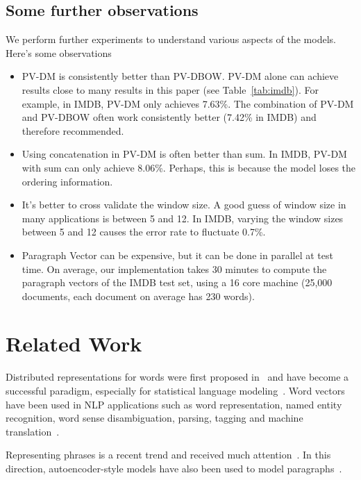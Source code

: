 \documentclass{article}
\begin{document}
\subsection{Some further observations}
We perform further experiments to understand various aspects of the
models. Here's some observations
\begin{itemize}
\item PV-DM is consistently better than PV-DBOW. PV-DM alone can
  achieve results close to many results in this paper (see
  Table~\ref{tab:imdb}). For example, in IMDB, PV-DM only achieves
  7.63\%. The combination of PV-DM and PV-DBOW often work consistently
  better (7.42\% in IMDB) and therefore recommended.
\item Using concatenation in PV-DM is often better than sum. In IMDB,
  PV-DM with sum can only achieve 8.06\%. Perhaps, this is because the
  model loses the ordering information.
\item It's better to cross validate the window size. A good
  guess of window size in many applications is between 5 and 12. In
  IMDB, varying the window sizes between 5 and 12 causes the error
  rate to fluctuate 0.7\%.
\item Paragraph Vector can be expensive, but it can be done in
  parallel at test time. On average, our implementation takes 30
  minutes to compute the paragraph vectors of the IMDB test set, using
  a 16 core machine (25,000 documents, each document on average has
  230 words).
\end{itemize}

\section{Related Work}






Distributed representations for words were first proposed
in~\cite{rumelhart1986learning} and have become a successful paradigm,
especially for statistical language
modeling~\cite{elman,bengio2006neural,mikolov2012}. Word vectors have
been used in NLP applications such as word representation, named
entity recognition, word sense disambiguation, parsing, tagging and
machine
translation~\cite{collobert2008unified,turney10,turian2010word,collobert2011natural,socher2011parsing,huang2012improving,zou13}.

Representing phrases is a recent trend and received much
attention~\cite{mitchell10,zanzotto10,yessenalina11,
  grefen13,phrases0}. In this direction, autoencoder-style models have
also been used to model paragraphs~\cite{maas11,laro12,sri13}.
\end{document}
